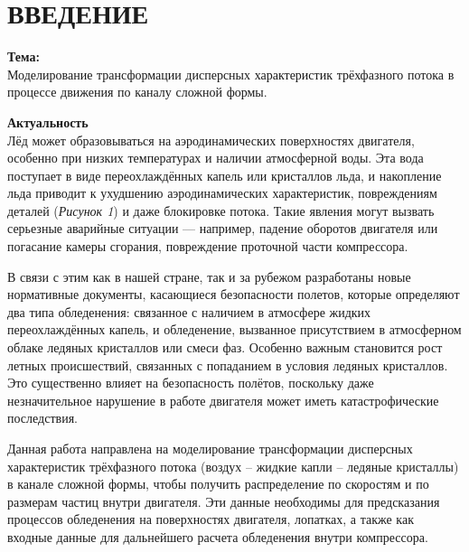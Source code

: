 \newpage
\chapter*{ВВЕДЕНИЕ}  


\textbf{Тема:}\\
\hspace*{1.25cm}Моделирование трансформации дисперсных характеристик трёхфазного потока в процессе движения по каналу сложной формы.

\textbf{Актуальность}\\
\hspace*{1.25cm}Лёд может образовываться на аэродинамических поверхностях двигателя, особенно при низких температурах и наличии атмосферной воды. Эта вода поступает в виде переохлаждённых капель или кристаллов льда, и накопление льда приводит к ухудшению аэродинамических характеристик, повреждениям деталей (\textit{Рисунок 1}) и даже блокировке потока. Такие явления могут вызвать серьезные аварийные ситуации — например, падение оборотов двигателя или погасание камеры сгорания, повреждение проточной части компрессора.

В связи с этим как в нашей стране, так и за рубежом разработаны новые нормативные документы, касающиеся безопасности полетов, которые определяют два типа обледенения: связанное с наличием в атмосфере жидких переохлаждённых капель, и обледенение, вызванное присутствием в атмосферном облаке ледяных кристаллов или смеси фаз. Особенно важным становится рост летных происшествий, связанных с попаданием в условия ледяных кристаллов. Это существенно влияет на безопасность полётов, поскольку даже незначительное нарушение в работе двигателя может иметь катастрофические последствия.

Данная работа направлена на моделирование трансформации дисперсных характеристик трёхфазного потока (воздух – жидкие капли – ледяные кристаллы) в канале сложной формы, чтобы получить распределение по скоростям и по размерам частиц внутри двигателя. Эти данные необходимы для предсказания процессов обледенения на поверхностях двигателя, лопатках, а также как входные данные для дальнейшего расчета обледенения внутри компрессора.

